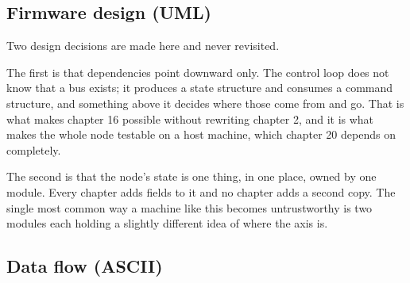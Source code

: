 \subsection*{Firmware design (UML)}


Two design decisions are made here and never revisited.

The first is that dependencies point downward only. The control loop does not
know that a bus exists; it produces a state structure and consumes a command
structure, and something above it decides where those come from and go. That is
what makes chapter 16 possible without rewriting chapter 2, and it is what makes
the whole node testable on a host machine, which chapter 20 depends on
completely.

The second is that the node's state is one thing, in one place, owned by one
module. Every chapter adds fields to it and no chapter adds a second copy. The
single most common way a machine like this becomes untrustworthy is two modules
each holding a slightly different idea of where the axis is.

\subsection*{Data flow (ASCII)}

